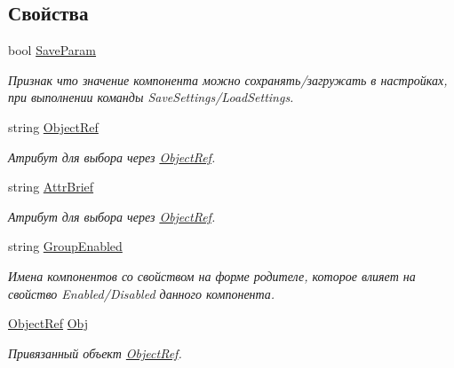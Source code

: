 \subsection*{Свойства}
\begin{DoxyCompactItemize}
\item 
bool \mbox{\hyperlink{class_f_b_a_1_1_radio_button_f_b_a_a494d3b9ad04576ee6b168584df50f01e}{Save\+Param}}
\begin{DoxyCompactList}\small\item\em Признак что значение компонента можно сохранять/загружать в настройках, при выполнении команды Save\+Settings/\+Load\+Settings. \end{DoxyCompactList}\item 
string \mbox{\hyperlink{class_f_b_a_1_1_radio_button_f_b_a_a0a6ac1c4dcf8b9f2a09b19a3ccd2e747}{Object\+Ref}}
\begin{DoxyCompactList}\small\item\em Атрибут для выбора через \mbox{\hyperlink{class_f_b_a_1_1_object_ref}{Object\+Ref}}. ~\newline
\end{DoxyCompactList}\item 
string \mbox{\hyperlink{class_f_b_a_1_1_radio_button_f_b_a_af5be9c53f9b8c569314b3b96d8f0fb74}{Attr\+Brief}}
\begin{DoxyCompactList}\small\item\em Атрибут для выбора через \mbox{\hyperlink{class_f_b_a_1_1_object_ref}{Object\+Ref}}. ~\newline
\end{DoxyCompactList}\item 
string \mbox{\hyperlink{class_f_b_a_1_1_radio_button_f_b_a_affd6df9f3e666815be9f52122269af10}{Group\+Enabled}}
\begin{DoxyCompactList}\small\item\em Имена компонентов со свойством на форме родителе, которое влияет на свойство Enabled/\+Disabled данного компонента. \end{DoxyCompactList}\item 
\mbox{\hyperlink{class_f_b_a_1_1_object_ref}{Object\+Ref}} \mbox{\hyperlink{class_f_b_a_1_1_radio_button_f_b_a_a22b00edcfc042171e46b7104fe235f45}{Obj}}
\begin{DoxyCompactList}\small\item\em Привязанный объект \mbox{\hyperlink{class_f_b_a_1_1_object_ref}{Object\+Ref}}. \end{DoxyCompactList}\end{DoxyCompactItemize}


